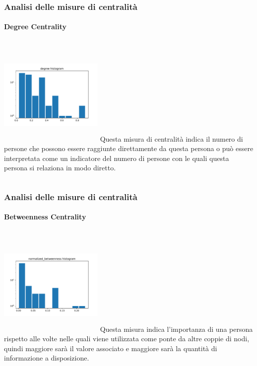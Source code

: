 \documentclass{beamer}
\begin{document}
\begin{frame}
\frametitle{Analisi delle misure di centralità}
\framesubtitle{Degree Centrality}
\begin{columns}
             \centering
             \includegraphics[height=5cm, 
             width=5cm]{images/centrality_measures/degree.pdf}
              Questa misura di centralità indica il numero di persone che possono essere raggiunte direttamente da questa persona o può essere interpretata come un indicatore del numero di persone con le quali questa persona si relaziona in modo diretto. 
         \end{columns} 

\end{frame}


\begin{frame}
\frametitle{Analisi delle misure di centralità}
\framesubtitle{Betweenness Centrality}
\begin{columns}
             \centering
             \includegraphics[height=5cm, 
             width=5cm]{images/centrality_measures/normalized_betweenness.pdf}
              Questa misura indica l'importanza di una persona rispetto alle volte nelle quali viene utilizzata come ponte da altre coppie di nodi, quindi maggiore sarà il valore associato e maggiore sarà la quantità di informazione a disposizione. 
         \end{columns} 

\end{frame}
\end{document}
